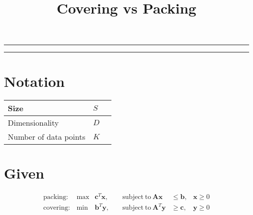 
\title{Covering vs Packing}
\date{}

\maketitle
\rule[0pt]{\textwidth}{1pt}
\tableofcontents
\rule[0pt]{\textwidth}{1pt}

\section{Notation}
\begin{table}[h]
\centering
\begin{tabular}{|l|l|l|}\hline
Size & $S$\\\hline
Dimensionality & $D$\\\hline
Number of data points & $K$\\\hline
\end{tabular}
\end{table}

\section{Given}


\begin{equation}
\begin{array}{lllllll}
\mathrm{packing:} &\max &\mathbf{c}^T\mathbf{x}, & \ \ \ \ \mathrm{\ subject \ to\ } \mathbf{Ax}                    &\leq \mathbf{b}, &\mathbf{x} \geq 0 \\
\mathrm{covering:} &\min &\mathbf{b}^T\mathbf{y}, & \ \ \ \ \mathrm{\ subject \ to\ } \mathbf{A}^T\mathbf{y} &\geq \mathbf{c}, &\mathbf{y} \geq 0 \\
\end{array}
\end{equation}



